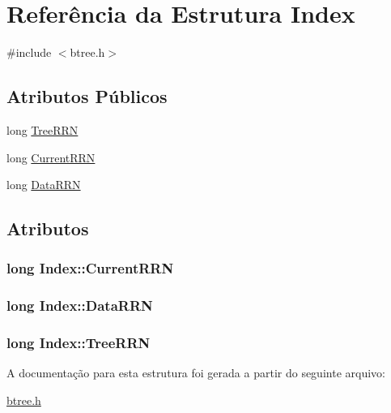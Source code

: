 \hypertarget{structIndex}{\section{Referência da Estrutura Index}
\label{structIndex}
}


{\ttfamily \#include $<$btree.\-h$>$}

\subsection*{Atributos Públicos}
\begin{DoxyCompactItemize}
\item 
long \hyperlink{structIndex_abc18e91cdf80acb1391a24c8dabc44fc}{Tree\-R\-R\-N}
\item 
long \hyperlink{structIndex_a102f1ea88d11b715afe345c9d23c79f3}{Current\-R\-R\-N}
\item 
long \hyperlink{structIndex_a3895b1845e85e7b85bf926ebc77dd572}{Data\-R\-R\-N}
\end{DoxyCompactItemize}


\subsection{Atributos}
\hypertarget{structIndex_a102f1ea88d11b715afe345c9d23c79f3}{
\subsubsection[{Current\-R\-R\-N}]{\setlength{\rightskip}{0pt plus 5cm}long Index\-::\-Current\-R\-R\-N}}\label{structIndex_a102f1ea88d11b715afe345c9d23c79f3}
\hypertarget{structIndex_a3895b1845e85e7b85bf926ebc77dd572}{
\subsubsection[{Data\-R\-R\-N}]{\setlength{\rightskip}{0pt plus 5cm}long Index\-::\-Data\-R\-R\-N}}\label{structIndex_a3895b1845e85e7b85bf926ebc77dd572}
\hypertarget{structIndex_abc18e91cdf80acb1391a24c8dabc44fc}{
\subsubsection[{Tree\-R\-R\-N}]{\setlength{\rightskip}{0pt plus 5cm}long Index\-::\-Tree\-R\-R\-N}}\label{structIndex_abc18e91cdf80acb1391a24c8dabc44fc}


A documentação para esta estrutura foi gerada a partir do seguinte arquivo\-:\begin{DoxyCompactItemize}
\item 
\hyperlink{btree_8h}{btree.\-h}\end{DoxyCompactItemize}

